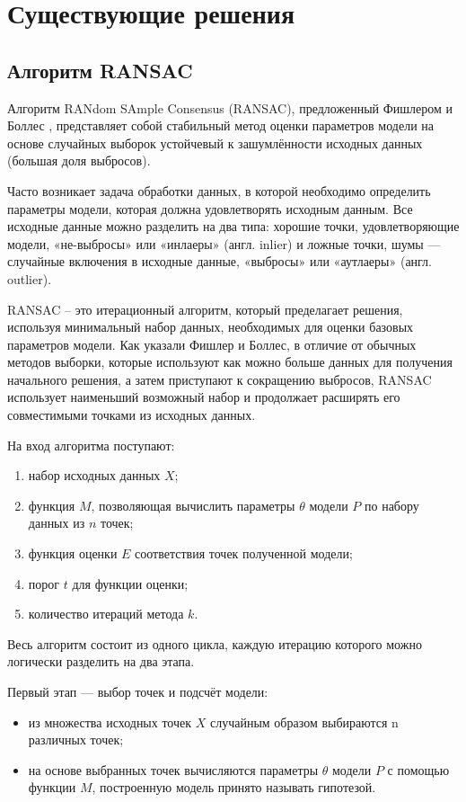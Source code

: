 \chapter{Существующие решения}
\section{Алгоритм RANSAC}
Алгоритм RANdom SAmple Consensus (RANSAC), предложенный Фишлером и Боллес \cite{RANSAC}, представляет собой стабильный метод оценки параметров модели на основе случайных выборок устойчевый к зашумлённости исходных данных (большая доля выбросов).

Часто возникает задача обработки данных, в которой необходимо определить параметры модели, которая должна удовлетворять исходным данным. Все исходные данные можно разделить на два типа: хорошие точки, удовлетворяющие модели, «не-выбросы» или «инлаеры» (англ. inlier) и ложные точки, шумы — случайные включения в исходные данные, «выбросы» или «аутлаеры» (англ. outlier).

RANSAC -- это итерационный алгоритм, который пределагает решения, используя минимальный набор данных, необходимых для оценки базовых параметров модели. Как указали Фишлер и Боллес, в отличие от обычных методов выборки, которые используют как можно больше данных для получения начального решения, а затем приступают к сокращению выбросов, RANSAC использует наименьший возможный набор и продолжает расширять его совместимыми точками из исходных данных.

На вход алгоритма поступают: 

\begin{enumerate}
	\item набор исходных данных $X$;
	\item функция $M$, позволяющая вычислить параметры $\theta$ модели $P$ по набору данных из $n$ точек;
	\item функция оценки $E$ соответствия точек полученной модели;
	\item порог $t$ для функции оценки;
	\item количество итераций метода $k$.
\end{enumerate}

Весь алгоритм состоит из одного цикла, каждую итерацию которого можно логически разделить на два этапа.

Первый этап — выбор точек и подсчёт модели:

\begin{itemize}
	\item из множества исходных точек $X$ случайным образом выбираются n различных точек;
	\item на основе выбранных точек вычисляются параметры $\theta$ модели $P$ с помощью функции $M$, построенную модель принято называть гипотезой.
\end{itemize}

